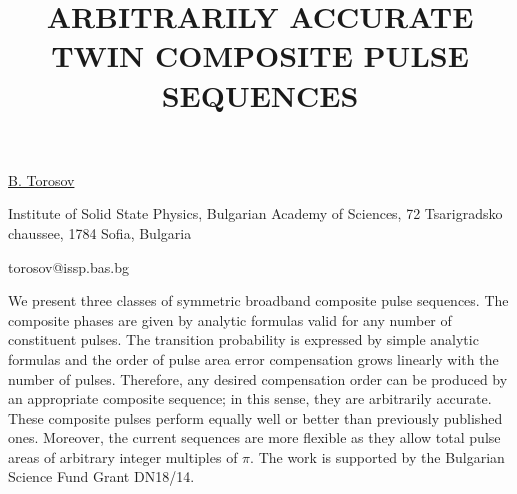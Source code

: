 \title{ARBITRARILY ACCURATE TWIN COMPOSITE PULSE SEQUENCES}

\underline{B. Torosov} 

{\normalsize{\vspace{-4mm}
Institute of Solid State Physics, Bulgarian Academy of Sciences, 72 Tsarigradsko chaussee, 1784 Sofia, Bulgaria

\email torosov@issp.bas.bg}}

We present three classes of symmetric broadband composite pulse sequences. The composite phases are given by analytic formulas valid for any number of constituent pulses. The transition probability is expressed by simple analytic formulas and the order of pulse area error compensation grows linearly with the number of pulses. Therefore, any desired compensation order can be produced by an appropriate composite sequence; in this sense, they are arbitrarily accurate. These composite pulses perform equally well or better than previously published ones. Moreover, the current sequences are more flexible as they allow total pulse areas of arbitrary integer multiples of $\pi$.
The work is supported by the Bulgarian Science Fund Grant DN18/14.

\vspace{\baselineskip}
